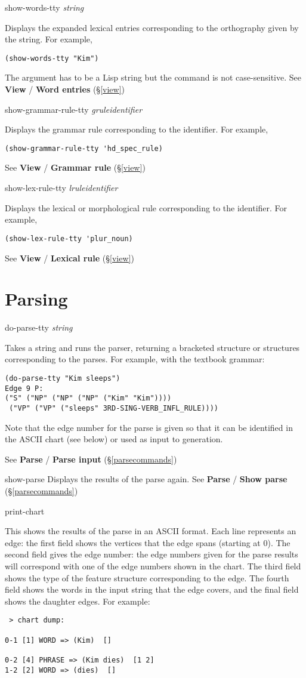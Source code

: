\documentclass[12pt]{report}
\newcommand{\lispcommand}[1]{\noindent\rm #1}%
\begin{document}
\lispcommand{show-words-tty {\it string}}

Displays the expanded lexical entries corresponding to the 
orthography given by the string.
For example,
\begin{verbatim}
(show-words-tty "Kim")
\end{verbatim}
The argument has to be a Lisp string but the command is
not case-sensitive.
See {\bf View} / {\bf Word entries} (\S\ref{view})

\lispcommand{show-grammar-rule-tty {\it gruleidentifier}}

Displays the grammar rule corresponding to the identifier.
For example,
\begin{verbatim}
(show-grammar-rule-tty 'hd_spec_rule)
\end{verbatim}
See {\bf View} / {\bf Grammar rule} (\S\ref{view})

\lispcommand{show-lex-rule-tty {\it lruleidentifier}}

Displays the lexical or
morphological rule corresponding to the identifier.
For example,
\begin{verbatim}
(show-lex-rule-tty 'plur_noun)
\end{verbatim}
See {\bf View} / {\bf Lexical rule} (\S\ref{view})

\section{Parsing}

\lispcommand{do-parse-tty {\it string}}

Takes a string and runs the parser, returning a bracketed 
structure or structures corresponding to the parses.
For example, with the textbook grammar:
\begin{verbatim}
(do-parse-tty "Kim sleeps")
Edge 9 P:
("S" ("NP" ("NP" ("NP" ("Kim" "Kim"))))
 ("VP" ("VP" ("sleeps" 3RD-SING-VERB_INFL_RULE))))
\end{verbatim}
Note that the edge number for the parse is given so that it
can be identified in the ASCII chart (see below) or used
as input to generation.

See {\bf Parse} / {\bf Parse input} (\S\ref{parsecommands})

\lispcommand{show-parse}
Displays the results of the parse again.
See {\bf Parse} / {\bf Show parse} (\S\ref{parsecommands})

\lispcommand{print-chart}

This shows the results of the parse in an ASCII format.
Each line represents an edge:
the first field shows the vertices that the
edge spans (starting at 0).  The second field
gives the edge number: the edge numbers given for the
parse results will correspond with one of the edge numbers
shown in the chart.  The third field shows the type of the
feature structure corresponding to the edge.
The fourth field shows the words in the input string that the
edge covers, and the final field shows the daughter edges.
For example:
\begin{verbatim}
 > chart dump:

0-1 [1] WORD => (Kim)  []

0-2 [4] PHRASE => (Kim dies)  [1 2]
1-2 [2] WORD => (dies)  []
\end{verbatim}
\end{document}
